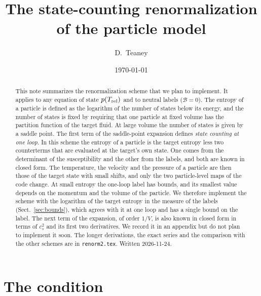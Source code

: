 \documentclass[11pt,aps,preprint,nofootinbib,superscriptaddress,tightenlines]{revtex4-2}
\def\Sect#1{Sect.~\ref{#1}}
\begin{document}
\sloppy

\title{The state-counting renormalization of the particle model}
\author{D.~Teaney}
\date{\today}

\begin{abstract}
This note summarizes the renormalization scheme that we plan to implement.  It applies to any equation of state $p(T_{\rm rel})$ and to neutral
labels ($\mathcal B=0$).  The entropy of a particle is defined as the logarithm of the number of states below its energy, and the number of states
is fixed by requiring that one particle at fixed volume has the partition function of the target fluid.  At large volume the number of states is
given by a saddle point.  The first term of the saddle-point expansion defines \emph{state counting at one loop}.  In this scheme the entropy of a
particle is the target entropy less two counterterms that are evaluated at the target's own state.  One comes from the determinant of the
susceptibility and the other from the labels, and both are known in closed form.  The temperature,
the velocity and the pressure of a particle are then those of the target state with small shifts, and only the two particle-level maps of the code
change.  At small entropy the one-loop label has bounds, and its smallest value depends on the momentum and the volume of the particle.  We
therefore implement the scheme with the logarithm of the target entropy in the measure of the labels (\Sect{sec:bounds}), which agrees with it at
one loop and has a single bound on the label.  The next term of the expansion, of order $1/V$, is also known in closed form in terms of $c_s^2$ and its first two derivatives.  We record
it in an appendix but do not plan to implement it soon.  The longer derivations, the exact series and the comparison with the other schemes are in
\nolinkurl{renorm2.tex}.  Written 2026-11-24.
\end{abstract}

\maketitle
\tableofcontents

\section{The condition}
\label{sec:condition}
\end{document}

